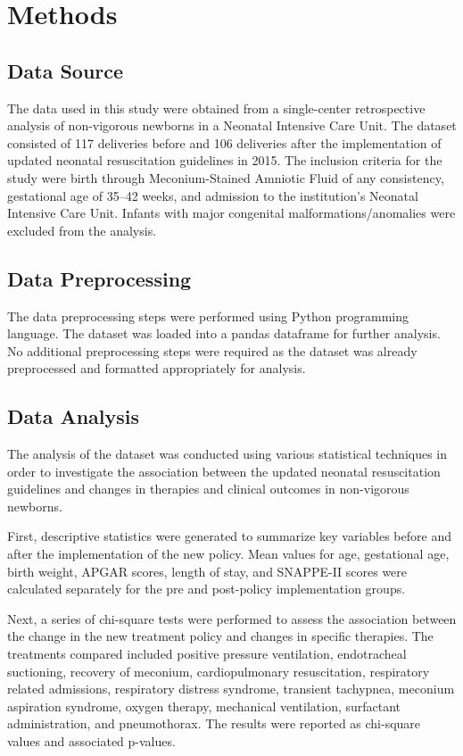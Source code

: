 \documentclass[11pt]{article}
\begin{document}
\section*{Methods}

\subsection*{Data Source}
The data used in this study were obtained from a single-center retrospective analysis of non-vigorous newborns in a Neonatal Intensive Care Unit. The dataset consisted of 117 deliveries before and 106 deliveries after the implementation of updated neonatal resuscitation guidelines in 2015. The inclusion criteria for the study were birth through Meconium-Stained Amniotic Fluid of any consistency, gestational age of 35–42 weeks, and admission to the institution’s Neonatal Intensive Care Unit. Infants with major congenital malformations/anomalies were excluded from the analysis.

\subsection*{Data Preprocessing}
The data preprocessing steps were performed using Python programming language. The dataset was loaded into a pandas dataframe for further analysis. No additional preprocessing steps were required as the dataset was already preprocessed and formatted appropriately for analysis.

\subsection*{Data Analysis}
The analysis of the dataset was conducted using various statistical techniques in order to investigate the association between the updated neonatal resuscitation guidelines and changes in therapies and clinical outcomes in non-vigorous newborns.

First, descriptive statistics were generated to summarize key variables before and after the implementation of the new policy. Mean values for age, gestational age, birth weight, APGAR scores, length of stay, and SNAPPE-II scores were calculated separately for the pre and post-policy implementation groups.

Next, a series of chi-square tests were performed to assess the association between the change in the new treatment policy and changes in specific therapies. The treatments compared included positive pressure ventilation, endotracheal suctioning, recovery of meconium, cardiopulmonary resuscitation, respiratory related admissions, respiratory distress syndrome, transient tachypnea, meconium aspiration syndrome, oxygen therapy, mechanical ventilation, surfactant administration, and pneumothorax. The results were reported as chi-square values and associated p-values.
\end{document}
